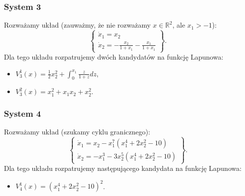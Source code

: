 \documentclass{article}
\begin{document}
        \subsubsection{System 3}
        Rozważamy układ (zauważmy, że nie rozważamy $x\in \mathbb{R}^{2}$, ale $x_{1} > -1$):
        \begin{equation}
            \label{eq:zadania_przyklad_3}
            \left\{
            \begin{array}{l}
                 \dot{x}_{1} = x_{2}\\
                 \dot{x}_{2} = -\frac{x_{2}}{1 + x_{1}} - \frac{x_{1}}{1 + x_{1}}
            \end{array}
            \right\}.
        \end{equation}
        Dla tego układu rozpatrujemy dwóch kandydatów na funkcję Lapunowa:
        \begin{itemize}[(a)]
            \item $V_{3}^{1}(x) = \frac{1}{2}x_{2}^{2} + \int_{0}^{x_{1}}{\frac{z}{1+z}dz}$,
            \item $V_{3}^{2}(x) = x_{1}^{2} + x_{1}x_{2} + x_{2}^{2}$.
        \end{itemize}

        \subsubsection{System 4}
        Rozważamy układ (szukamy cyklu granicznego):
        \begin{equation}
            \label{eq:zadania_przyklad_4}
            \left\{
            \begin{array}{l}
                 \dot{x}_{1} = x_{2} - x_{1}^7 \left( x_{1}^{4} + 2x_{2}^{2} - 10 \right)\\
                 \dot{x}_{2} = -x_{1}^{3} - 3x_{2}^{5} \left( x_{1}^{4} + 2x_{2}^{2} - 10 \right)
            \end{array}
            \right\}.
        \end{equation}
        Dla tego układu rozpatrujemy następującego kandydata na funkcję Lapunowa:
        \begin{itemize}[(a)]
            \item $V_{4}^{1}(x) = \left( x_{1}^{4} + 2x_{2}^{2} - 10 \right)^{2}$.
        \end{itemize}
\end{document}
